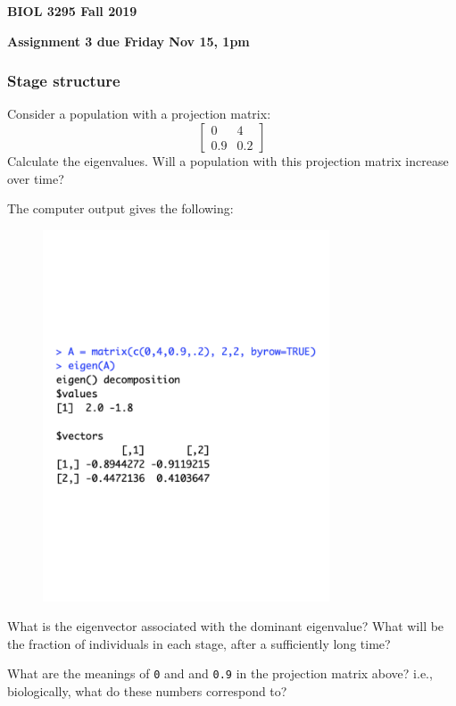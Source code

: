 \documentclass[11pt, oneside]{article}   	%
\begin{document}
\textbf{BIOL 3295 Fall 2019}

\textbf{Assignment 3 due Friday Nov 15, 1pm}
\begin{description}
\subsubsection*{Stage structure}

\item[1.] Consider a population with a projection matrix:
\[
\left[
\begin{array}{cc}
0 & 4 \\
0.9 & 0.2
\end{array}
\right]
\]
Calculate the eigenvalues. Will a population with this projection matrix increase over time?

\item[2.] The computer output gives the following:
\vspace{-3.5cm}
\begin{figure}[!ht]
\includegraphics[height=11cm]{Routput}
\end{figure}
\vspace{-3.5cm}

 What is the eigenvector associated with the dominant eigenvalue? What will be the fraction of individuals in each stage, after a sufficiently long time?
 
 \item[3.] What are the meanings of \texttt{0} and and \texttt{0.9} in the projection matrix above? i.e., biologically, what do these numbers correspond to?
 

\end{description}
\end{document}
